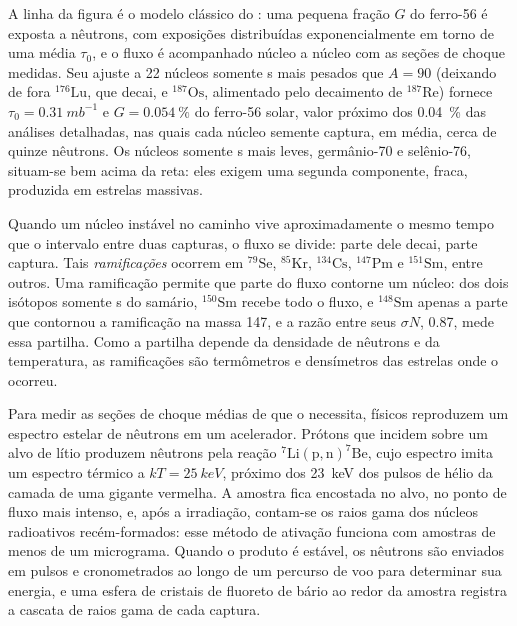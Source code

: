 A linha da figura é o modelo clássico do : uma pequena
fração $G$ do ferro-56 é exposta a nêutrons, com exposições distribuídas
exponencialmente em torno de uma média $\tau_0$, e o fluxo é acompanhado
núcleo a núcleo com as seções de choque medidas. Seu ajuste a 22 núcleos somente s
mais pesados que $A = 90$ (deixando de fora $^{176}\mathrm{Lu}$, que
decai, e $^{187}\mathrm{Os}$, alimentado pelo decaimento de
$^{187}\mathrm{Re}$) fornece $\tau_0 = \qty{0.31}{mb^{-1}}$ e
$G = \qty{0.054}{\percent}$ do ferro-56 solar, valor próximo dos
\qty{0.04}{\percent} das análises detalhadas, nas quais cada núcleo semente
captura, em média, cerca de quinze nêutrons. Os núcleos somente s mais
leves, germânio-70 e selênio-76, situam-se bem acima da reta: eles
exigem uma segunda componente, fraca, produzida em estrelas massivas.

Quando um núcleo instável no caminho vive aproximadamente o mesmo tempo que
o intervalo entre duas capturas, o fluxo se divide: parte dele decai, parte captura.
Tais \emph{ramificações} ocorrem em $^{79}\mathrm{Se}$, $^{85}\mathrm{Kr}$,
$^{134}\mathrm{Cs}$, $^{147}\mathrm{Pm}$ e $^{151}\mathrm{Sm}$, entre outros.
Uma ramificação permite que parte do fluxo contorne um núcleo: dos dois
isótopos somente s do samário, $^{150}\mathrm{Sm}$ recebe todo o
fluxo, e $^{148}\mathrm{Sm}$ apenas a parte que contornou a
ramificação na massa 147, e a razão entre seus $\sigma N$, \num{0.87},
mede essa partilha. Como a partilha depende da densidade de nêutrons e da
temperatura, as ramificações são termômetros e densímetros das estrelas
onde o  ocorreu.

\begin{inthelab}
Para medir as seções de choque médias de que o  necessita, físicos
reproduzem um espectro estelar de nêutrons em um acelerador. Prótons que incidem
sobre um alvo de lítio produzem nêutrons pela reação
$^{7}\mathrm{Li}(\mathrm{p},\mathrm{n})^{7}\mathrm{Be}$, cujo espectro
imita um espectro térmico a $kT = \qty{25}{keV}$, próximo dos
\qty{23}{keV} dos pulsos de hélio da camada de uma gigante vermelha. A amostra fica
encostada no alvo, no ponto de fluxo mais intenso, e, após a
irradiação, contam-se os raios gama dos núcleos radioativos recém-formados:
esse método de ativação funciona com amostras de menos de um
micrograma. Quando o produto é estável, os nêutrons são enviados em pulsos
e cronometrados ao longo de um percurso de voo para determinar sua energia, e uma esfera de
cristais de fluoreto de bário ao redor da amostra registra a cascata de raios gama
de cada captura.
\end{inthelab}

